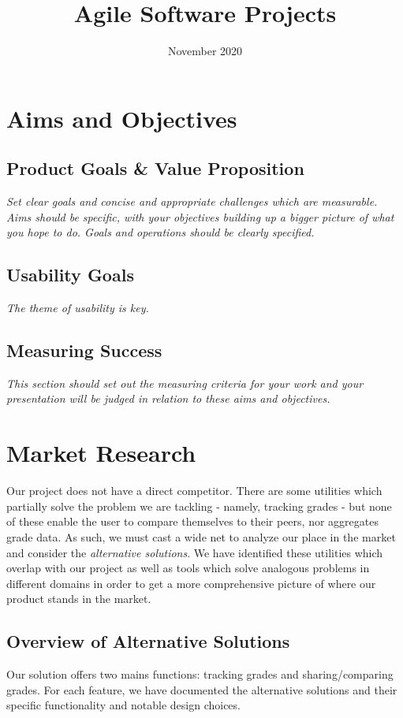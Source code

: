 \documentclass{article}
\title{Agile Software Projects}
\author{}
\date{November 2020}
\begin{document}
\maketitle
\tableofcontents
\listoffigures
\newpage

\section{Aims and Objectives}
\subsection{Product Goals \& Value Proposition}
\emph{Set clear goals and concise and appropriate challenges which are measurable. Aims should be specific, with your objectives building up a bigger picture of what you hope to do. Goals and operations should be clearly specified.}

\subsection{Usability Goals}
\textit{The theme of usability is key.}

\subsection{Measuring Success}
\textit{This section should set out the measuring criteria for your work and your presentation will be judged in relation to these aims and objectives.}

\section{Market Research}
Our project does not have a direct competitor. There are some utilities which partially solve the problem we are tackling - namely, tracking grades - but none of these enable the user to compare themselves to their peers, nor aggregates grade data. As such, we must cast a wide net to analyze our place in the market and consider the \textit{alternative solutions}. We have identified these utilities which overlap with our project as well as tools which solve analogous problems in different domains in order to get a more comprehensive picture of where our product stands in the market.
\subsection{Overview of Alternative Solutions}
Our solution offers two mains functions: tracking grades and sharing/comparing grades. For each feature, we have documented the alternative solutions and their specific functionality and notable design choices.
\end{document}

